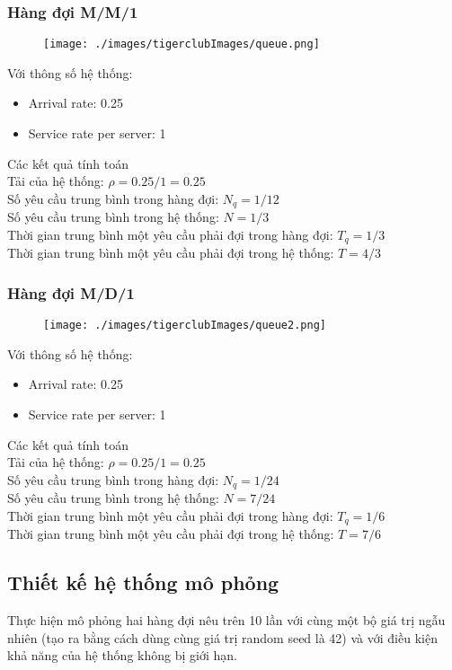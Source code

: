 \documentclass[a4paper]{article}
\begin{document}
\subsubsection*{Hàng đợi M/M/1}
\begin{figure}[H]
\texttt{[image: ./images/tigerclubImages/queue.png]}
\end{figure}	
Với thông số hệ thống:
\begin{itemize}
\item Arrival rate: 0.25
\item Service rate per server: 1
\end{itemize}
Các kết quả tính toán\\
Tải của hệ thống: $\rho = 0.25/1 = 0.25$\\
Số yêu cầu trung bình trong hàng đợi: $N_q=1/12$\\
Số yêu cầu trung bình trong hệ thống: $N=1/3$\\
Thời gian trung bình một yêu cầu phải đợi trong hàng đợi: $T_q= 1/3$\\
Thời gian trung bình một yêu cầu phải đợi trong hệ thống: $T=4/3$

\subsubsection*{Hàng đợi M/D/1}
\begin{figure}[H]
\texttt{[image: ./images/tigerclubImages/queue2.png]}
\end{figure}	
Với thông số hệ thống:
\begin{itemize}
\item Arrival rate: 0.25
\item Service rate per server: 1
\end{itemize}
Các kết quả tính toán\\
Tải của hệ thống: $\rho = 0.25/1 = 0.25$\\
Số yêu cầu trung bình trong hàng đợi: $N_q=1/24$\\
Số yêu cầu trung bình trong hệ thống: $N=7/24$\\
Thời gian trung bình một yêu cầu phải đợi trong hàng đợi: $T_q= 1/6$\\
Thời gian trung bình một yêu cầu phải đợi trong hệ thống: $T=7/6$
\subsection{Thiết kế hệ thống mô phỏng}
Thực hiện mô phỏng hai hàng đợi nêu trên 10 lần với cùng một bộ giá trị ngẫu nhiên (tạo ra bằng cách dùng cùng giá trị random seed là 42) và với điều kiện khả năng của hệ thống không bị giới hạn.
\end{document}

